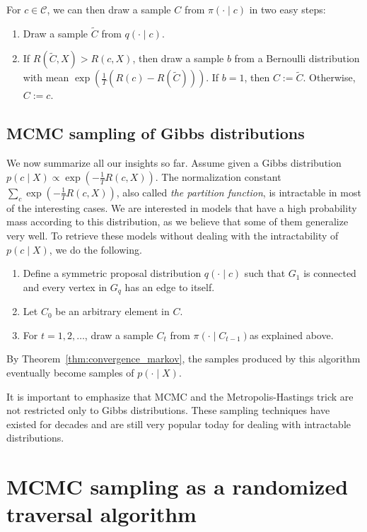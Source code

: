 For $c \in \mathcal{C}$, we can then draw a sample $C$ from $\pi(\cdot \mid c)$ in two easy steps:

\begin{enumerate}
\item Draw a sample $\tilde{C}$ from $q(\cdot \mid c)$.
\item If $R(\tilde{C}, X) > R(c, X)$, then draw a sample $b$ from a Bernoulli distribution with mean $\exp\left(\frac{1}{T}\left(R(c) - R(\tilde{C})\right)\right)$. If $b = 1$, then $C:= \tilde{C}$. Otherwise, $C := c$.
\end{enumerate}

\subsection{MCMC sampling of Gibbs distributions}

We now summarize all our insights so far. Assume given a Gibbs distribution $p(c \mid X) \propto \exp\left(-\frac{1}{T}R(c, X)\right)$. The normalization constant
$\sum_{c} \exp\left(-\frac{1}{T}R(c, X)\right)$,
also called \emph{the partition function}, is intractable in most of the interesting
cases. We are interested in models that have a high probability mass according
to this distribution, as we believe that some of them generalize
very well. To retrieve these models without dealing with the intractability
of $p(c \mid X)$, we do the following.

\begin{enumerate}
\item Define a symmetric proposal distribution $q(\cdot \mid c)$ such that $G_1$ is
connected and every vertex in $G_q$ has an edge to itself.
\item Let $C_0$ be an arbitrary element in $C$.
\item For $t = 1, 2, \ldots$, draw a sample $C_t$ from $\pi(\cdot \mid C_{t-1})$as explained
above.
\end{enumerate}

By Theorem~\ref{thm:convergence_markov}, the samples produced by this algorithm eventually become
samples of $p(\cdot \mid X)$.

It is important to emphasize that MCMC and the Metropolis-Hastings
trick are not restricted only to Gibbs distributions. These sampling techniques
have existed for decades and are still very popular today for dealing
with intractable distributions.

\section{MCMC sampling as a randomized traversal algorithm}
\label{sec:mcmc_traversal}

